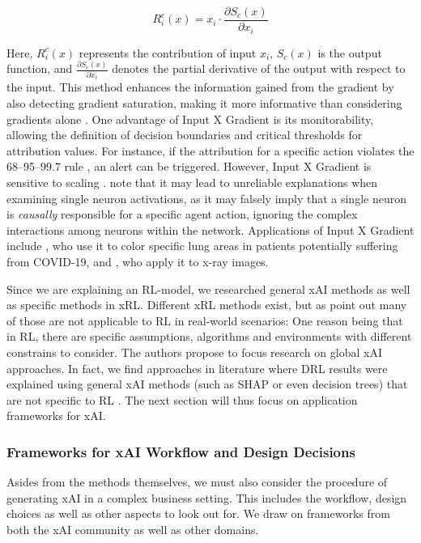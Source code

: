 \[
  R_{i}^{c}(x) = x_i \cdot \frac{\partial S_c(x)}{\partial x_i}
\]

Here, \( R_{i}^{c}(x) \) represents the contribution of input \( x_i \), \( S_c(x) \) is the output function, and \( \frac{\partial S_c(x)}{\partial x_i} \) denotes the partial derivative of the output with respect to the input. This method enhances the information gained from the gradient by also detecting gradient saturation, making it more informative than considering gradients alone .
One advantage of Input X Gradient is its monitorability, allowing the definition of decision boundaries and critical thresholds for attribution values. For instance, if the attribution for a specific action violates the 68–95–99.7 rule , an alert can be triggered. However, Input X Gradient is sensitive to scaling .  note that it may lead to unreliable explanations when examining single neuron activations, as it may falsely imply that a single neuron is \textit{causally} responsible for a specific agent action, ignoring the complex interactions among neurons within the network.
Applications of Input X Gradient include , who use it to color specific lung areas in patients potentially suffering from COVID-19, and , who apply it to x-ray images.

Since we are explaining an RL-model, we researched general xAI methods as well as specific methods in xRL. Different xRL methods exist, but as  point out many of those are not applicable to RL in real-world scenarios: One reason being that in RL, there are specific assumptions, algorithms and environments with different constrains to consider. The authors propose to focus research on global xAI approaches.
In fact, we find approaches in literature where DRL results were explained using general xAI methods (such as SHAP or even decision trees) that are not specific to RL . The next section will thus focus on application frameworks for xAI.

\subsubsection{Frameworks for xAI Workflow and Design Decisions}
Asides from the methods themselves, we must also consider the procedure of generating xAI in a complex business setting. This includes the workflow, design choices as well as other aspects to look out for. We draw on frameworks from both the xAI community as well as other domains.

